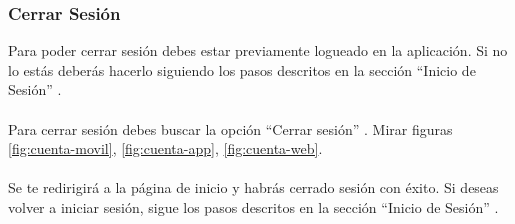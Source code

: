 \subsubsection{Cerrar Sesión}
Para poder cerrar sesión debes estar previamente logueado en la aplicación. Si no lo estás deberás hacerlo siguiendo los pasos descritos en la sección “Inicio de Sesión” .
\\ \\[1ex]
Para cerrar sesión debes buscar la opción “Cerrar sesión” . Mirar figuras \ref{fig:cuenta-movil}, \ref{fig:cuenta-app}, \ref{fig:cuenta-web}.
\\ \\[1ex]
Se te redirigirá a la página de inicio y habrás cerrado sesión con éxito. Si deseas volver a iniciar sesión, sigue los pasos descritos en la sección “Inicio de Sesión” .


